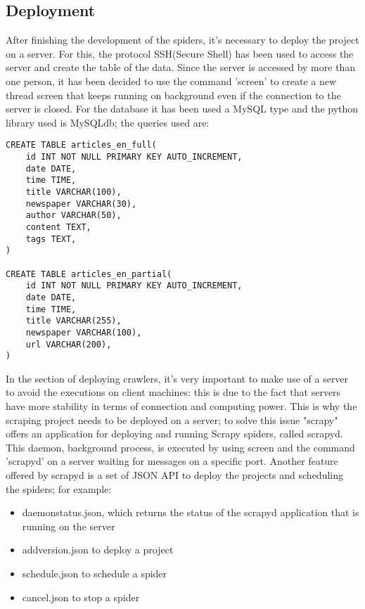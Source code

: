 \subsection{Deployment}
After finishing the development of the spiders, it's necessary to deploy the project on a server. 
For this, the protocol SSH(Secure Shell)\cite{ssh} has been used to access the server and create the table of the data.
Since the server is accessed by more than one person, it has been decided to use the command 'screen' to create a new thread screen that keeps running on background even if the connection to the server is closed. For the database it has been used a MySQL type and the python library used is MySQLdb; the queries used are:
\begin{verbatim}
CREATE TABLE articles_en_full(
    id INT NOT NULL PRIMARY KEY AUTO_INCREMENT,
    date DATE,
    time TIME,
    title VARCHAR(100),
    newspaper VARCHAR(30),
    author VARCHAR(50),
	content TEXT,
    tags TEXT,
)

CREATE TABLE articles_en_partial(
    id INT NOT NULL PRIMARY KEY AUTO_INCREMENT,
    date DATE,
    time TIME,
    title VARCHAR(255),
    newspaper VARCHAR(100),
    url VARCHAR(200),
)
\end{verbatim} 
In the section of deploying crawlers, it's very important to make use of a server to avoid the executions on client machines: this is due to the fact that servers have more stability in terms of connection and computing power. 
This is why the scraping project needs to be deployed on a server; to solve this issue "scrapy" offers an application for deploying and running Scrapy spiders, called scrapyd\cite{scrapyd}. 
This daemon, background process, is executed by using screen and the command 'scrapyd' on a server waiting for messages on a specific port. 
Another feature offered by scrapyd is a set of JSON API to deploy the projects and scheduling the spiders; for example:
\begin{itemize}
	\item daemonstatus.json, which returns the status of the scrapyd application that is running on the server
	\item addversion.json to deploy a project
	\item schedule.json to schedule a spider
	\item cancel.json to stop a spider
\end{itemize}
